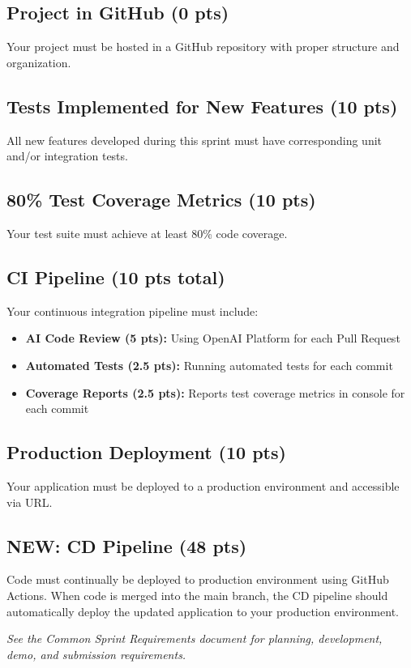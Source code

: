 \documentclass[11pt]{article}
\begin{document}
\subsection{Project in GitHub (0 pts)}
Your project must be hosted in a GitHub repository with proper structure and organization.

\subsection{Tests Implemented for New Features (10 pts)}
All new features developed during this sprint must have corresponding unit and/or integration tests.

\subsection{80\% Test Coverage Metrics (10 pts)}
Your test suite must achieve at least 80\% code coverage.

\subsection{CI Pipeline (10 pts total)}
Your continuous integration pipeline must include:
\begin{itemize}
    \item \textbf{AI Code Review (5 pts):} Using OpenAI Platform for each Pull Request
    \item \textbf{Automated Tests (2.5 pts):} Running automated tests for each commit
    \item \textbf{Coverage Reports (2.5 pts):} Reports test coverage metrics in console for each commit
\end{itemize}

\subsection{Production Deployment (10 pts)}
Your application must be deployed to a production environment and accessible via URL.

\subsection{\textcolor{newitem}{NEW:} CD Pipeline (48 pts)}
Code must continually be deployed to production environment using GitHub Actions. When code is merged into the main branch, the CD pipeline should automatically deploy the updated application to your production environment.

\vspace{2em}
\noindent\textit{See the Common Sprint Requirements document for planning, development, demo, and submission requirements.}
\end{document}

